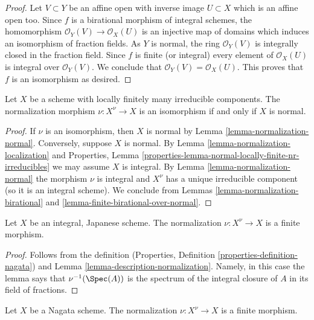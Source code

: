 \begin{proof}
Let $V \subset Y$ be an affine open
with inverse image $U \subset X$ which is an affine open too.
Since $f$ is a birational morphism of integral schemes, the homomorphism
$\mathcal{O}_Y(V) \to \mathcal{O}_X(U)$ is an injective map of domains
which induces an isomorphism of fraction fields. As $Y$ is normal,
the ring $\mathcal{O}_Y(V)$ is integrally closed in the fraction field.
Since $f$ is finite (or integral) every element of $\mathcal{O}_X(U)$
is integral over $\mathcal{O}_Y(V)$. We conclude that
$\mathcal{O}_Y(V) = \mathcal{O}_X(U)$. This proves that $f$ is an
isomorphism as desired.
\end{proof}

\begin{lemma}
\label{lemma-normalization-trivial}
Let $X$ be a scheme with locally finitely many irreducible components.
The normalization morphism $\nu : X^\nu \to X$ is an isomorphism
if and only if $X$ is normal.
\end{lemma}

\begin{proof}
If $\nu$ is an isomorphism, then $X$ is normal by
Lemma \ref{lemma-normalization-normal}.
Conversely, suppose $X$ is normal.
By Lemma \ref{lemma-normalization-localization} and
Properties, Lemma \ref{properties-lemma-normal-locally-finite-nr-irreducibles}
we may assume $X$ is integral.
By Lemma \ref{lemma-normalization-normal} the morphism
$\nu$ is integral and $X^\nu$ has a unique irreducible component
(so it is an integral scheme).
We conclude from Lemmas \ref{lemma-normalization-birational} and
\ref{lemma-finite-birational-over-normal}.
\end{proof}

\begin{lemma}
\label{lemma-Japanese-normalization}
Let $X$ be an integral, Japanese scheme.
The normalization $\nu : X^\nu \to X$ is a finite morphism.
\end{lemma}

\begin{proof}
Follows from the definition
(Properties, Definition \ref{properties-definition-nagata}) and
Lemma \ref{lemma-description-normalization}. Namely, in this case
the lemma says that $\nu^{-1}(\Spec(A))$ is the spectrum
of the integral closure of $A$ in its field of fractions.
\end{proof}

\begin{lemma}
\label{lemma-nagata-normalization}
Let $X$ be a Nagata scheme.
The normalization $\nu : X^\nu \to X$ is a finite morphism.
\end{lemma}

